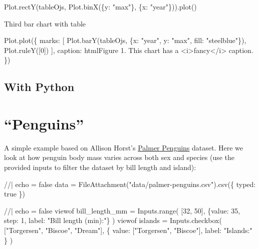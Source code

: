 \documentclass[
  a4paper,
]{scrbook}
\newenvironment{Shaded}{}{}
\newcommand{\NormalTok}[1]{\textcolor[rgb]{0.14,0.16,0.18}{#1}}
\begin{document}
\begin{Shaded}
\begin{Highlighting}[numbers=left,,]

\NormalTok{Plot.rectY(tableOjs, Plot.binX(\{y: "max"\}, \{x: "year"\})).plot()}
\end{Highlighting}
\end{Shaded}

Third bar chart with table

\begin{Shaded}
\begin{Highlighting}[numbers=left,,]
\NormalTok{Plot.plot(\{}
\NormalTok{  marks: [}
\NormalTok{    Plot.barY(tableOjs, \{x: "year", y: "max", fill: "steelblue"\}),}
\NormalTok{    Plot.ruleY([0])}
\NormalTok{  ],}
\NormalTok{  caption: html\textasciigrave{}Figure 1. This chart has a \textless{}i\textgreater{}fancy\textless{}/i\textgreater{} caption.\textasciigrave{}}
\NormalTok{\})}
\end{Highlighting}
\end{Shaded}

\hypertarget{with-python}{%
\section{With Python}\label{with-python}}

\hypertarget{penguins}{%
\chapter{``Penguins''}\label{penguins}}

A simple example based on Allison Horst's
\href{https://allisonhorst.github.io/palmerpenguins/}{Palmer Penguins}
dataset. Here we look at how penguin body mass varies across both sex
and species (use the provided inputs to filter the dataset by bill
length and island):

\begin{Shaded}
\begin{Highlighting}[numbers=left,,]
\NormalTok{//| echo = false}
\NormalTok{data = FileAttachment("data/palmer{-}penguins.csv").csv(\{ typed: true \})}
\end{Highlighting}
\end{Shaded}

\begin{Shaded}
\begin{Highlighting}[numbers=left,,]
\NormalTok{//| echo = false}
\NormalTok{viewof bill\_length\_mm = Inputs.range(}
\NormalTok{  [32, 50], }
\NormalTok{  \{value: 35, step: 1, label: "Bill length (min):"\}}
\NormalTok{)}
\NormalTok{viewof islands = Inputs.checkbox(}
\NormalTok{  ["Torgersen", "Biscoe", "Dream"], }
\NormalTok{  \{ value: ["Torgersen", "Biscoe"], }
\NormalTok{    label: "Islands:"}
\NormalTok{  \}}
\NormalTok{)}
\end{Highlighting}
\end{Shaded}
\end{document}
